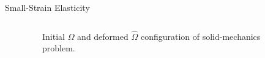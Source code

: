 \begin{frame}{Small-Strain Elasticity}
\begin{columns}
\begin{itemize}
			\end{itemize}


		\begin{figure}
			\begin{center}
				\resizebox{!}{6.5cm}{}
				\caption{Initial $\Omega$ and deformed $\hat{\Omega}$ configuration of solid-mechanics problem.}
			\end{center}
		\end{figure}
	\end{columns}
\end{frame}

